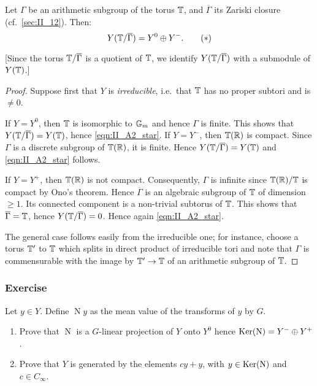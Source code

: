 \begin{subappendices}
\begin{prop}
	Let $\Gamma$ be an arithmetic subgroup of the torus $\mathbb{T}$,
	and $\overline{\Gamma}$ its Zariski closure (cf.\ \ref{sec:II_12}). Then:
	\begin{equation}
		Y(\mathbb{T}/\overline{\Gamma}) = Y^0 \oplus Y^-.
		\tag{$*$}
		\label{eqn:II_A2_star}
	\end{equation}
\end{prop}
{[Since the torus $\mathbb{T}/\overline{\Gamma}$ is a quotient of $\mathbb{T}$, we identify
$Y(\mathbb{T}/\overline{\Gamma})$ with a submodule of $Y(\mathbb{T})$.]}
\begin{proof}
	Suppose first that $Y$ is \emph{irreducible}, i.e.\ that $\mathbb{T}$ has no
	proper subtori and is $\ne 0$.

	If $Y = Y^0$, then $\mathbb{T}$ is isomorphic to $\mathbb{G}_m$ and hence $\Gamma$ is
	finite.  This shows that $Y(\mathbb{T}/\overline{\Gamma}) = Y(\mathbb{T})$, hence
	\eqref{eqn:II_A2_star}. If $Y = Y^-$, then $\mathbb{T}(\mathbb{R})$ is compact. Since
	$\Gamma$ is a discrete subgroup of $\mathbb{T}(\mathbb{R})$, it is finite.  Hence
	$Y(\mathbb{T}/\overline{\Gamma}) = Y(\mathbb{T})$ and \eqref{eqn:II_A2_star} follows.

	If $Y = Y^+$, then $\mathbb{T}(\mathbb{R})$ is not compact. Consequently, $\Gamma$ is
	infinite since $\mathbb{T}(\mathbb{R})/\mathbb{T}$ is compact by Ono's theorem. Hence
	$\overline{\Gamma}$ is an algebraic subgroup of $\mathbb{T}$ of dimension $\ge
	1$. Its connected component is a non-trivial subtorus of $\mathbb{T}$. This
	shows that $\overline{\Gamma} = \mathbb{T}$, hence $Y(\mathbb{T}/\overline{\Gamma}) =
	0$. Hence again \eqref{eqn:II_A2_star}.

	The general case follows easily from the irreducible one; for
	\dpage
	instance, choose a torus $\mathbb{T}'$ to $\mathbb{T}$ which splits in direct product
	of irreducible tori and note that $\Gamma$ is commensurable with the
	image by $\mathbb{T}' \to \mathbb{T}$ of an arithmetic subgroup of $\mathbb{T}$.
\end{proof}

\subsubsection*{Exercise}
Let $y \in Y$. Define $\operatorname{N} y$ as the mean value of the transforms of
$y$ by $G$.
\begin{enumerate}[label=\textit{\alph*}.]
\item Prove that $\operatorname{N}$ is a $G$-linear projection of $Y$ onto
	$Y^0$ hence $\operatorname{Ker}(\operatorname{N}) = Y^- \oplus Y^+$.
\item Prove that $Y$ is generated by the elements $cy + y$, with $y \in
	\operatorname{Ker}(\operatorname{N})$ and $c \in C_\infty$.
\end{enumerate}
\end{subappendices}
